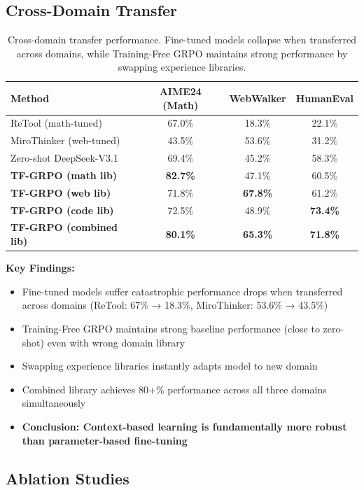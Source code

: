 \subsection{Cross-Domain Transfer}
\label{sec:transfer}

\begin{table}[h]
\centering
\caption{Cross-domain transfer performance. Fine-tuned models collapse when transferred across domains, while Training-Free GRPO maintains strong performance by swapping experience libraries.}
\label{tab:transfer}
\begin{tabular}{@{}lccc@{}}
\toprule
\textbf{Method} & \textbf{AIME24 (Math)} & \textbf{WebWalker} & \textbf{HumanEval} \\
\midrule
ReTool (math-tuned) & 67.0\% & 18.3\% & 22.1\% \\
MiroThinker (web-tuned) & 43.5\% & 53.6\% & 31.2\% \\
\midrule
Zero-shot DeepSeek-V3.1 & 69.4\% & 45.2\% & 58.3\% \\
\midrule
\textbf{TF-GRPO (math lib)} & \textbf{82.7\%} & 47.1\% & 60.5\% \\
\textbf{TF-GRPO (web lib)} & 71.8\% & \textbf{67.8\%} & 61.2\% \\
\textbf{TF-GRPO (code lib)} & 72.5\% & 48.9\% & \textbf{73.4\%} \\
\textbf{TF-GRPO (combined lib)} & \textbf{80.1\%} & \textbf{65.3\%} & \textbf{71.8\%} \\
\bottomrule
\end{tabular}
\end{table}

\textbf{Key Findings:}
\begin{itemize}
    \item Fine-tuned models suffer catastrophic performance drops when transferred across domains (ReTool: 67\% → 18.3\%, MiroThinker: 53.6\% → 43.5\%)
    \item Training-Free GRPO maintains strong baseline performance (close to zero-shot) even with wrong domain library
    \item Swapping experience libraries instantly adapts model to new domain
    \item Combined library achieves 80+\% performance across all three domains simultaneously
    \item \textbf{Conclusion: Context-based learning is fundamentally more robust than parameter-based fine-tuning}
\end{itemize}

\subsection{Ablation Studies}

